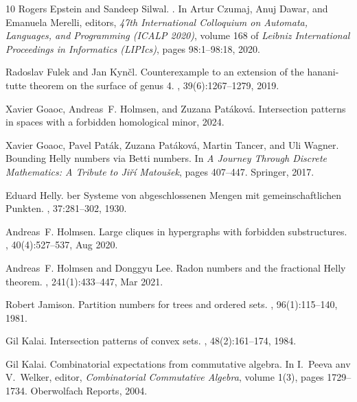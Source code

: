 \documentclass[11pt]{article}
\begin{document}
\begin{thebibliography}{10}
Rogers Epstein and Sandeep Silwal.
.
\newblock In Artur Czumaj, Anuj Dawar, and Emanuela Merelli, editors, {\em 47th
  International Colloquium on Automata, Languages, and Programming (ICALP
  2020)}, volume 168 of {\em Leibniz International Proceedings in Informatics
  (LIPIcs)}, pages 98:1--98:18, 2020.

Radoslav Fulek and Jan Kyn{\v{c}}l.
\newblock Counterexample to an extension of the hanani-tutte theorem on the
  surface of genus 4.
, 39(6):1267--1279, 2019.

Xavier Goaoc, Andreas~F. Holmsen, and Zuzana Patáková.
\newblock Intersection patterns in spaces with a forbidden homological minor,
  2024.

Xavier Goaoc, Pavel Pat{\'a}k, Zuzana Pat{\'a}kov{\'a}, Martin Tancer, and Uli
  Wagner.
\newblock Bounding {H}elly numbers via {B}etti numbers.
\newblock In {\em A Journey Through Discrete Mathematics: A Tribute to
  Ji{\v{r}}{\'i} Matou{\v{s}}ek}, pages 407--447. Springer, 2017.

Eduard Helly.
ber {S}ysteme von abgeschlossenen {M}engen mit
  gemeinschaftlichen {P}unkten.
, 37:281--302, 1930.

Andreas~F. Holmsen.
\newblock Large cliques in hypergraphs with forbidden substructures.
, 40(4):527--537, Aug 2020.

Andreas~F. Holmsen and Donggyu Lee.
\newblock Radon numbers and the fractional {H}elly theorem.
, 241(1):433--447, Mar 2021.

Robert Jamison.
\newblock Partition numbers for trees and ordered sets.
, 96(1):115--140, 1981.

Gil Kalai.
\newblock Intersection patterns of convex sets.
, 48(2):161--174, 1984.

Gil Kalai.
\newblock Combinatorial expectations from commutative algebra.
\newblock In I.~Peeva anv V.~Welker, editor, {\em Combinatorial Commutative
  Algebra}, volume 1(3), pages 1729--1734. Oberwolfach Reports, 2004.


\end{thebibliography}
\end{document}

